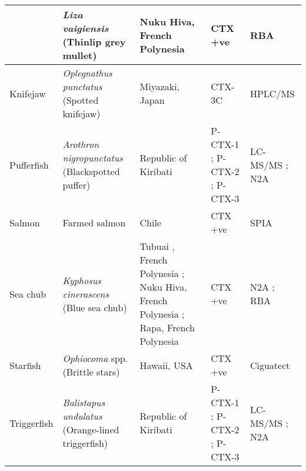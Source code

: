\documentclass[12pt]{article}
\begin{document}
\begin{longtable}[l]{ | p{2cm} | p{3cm} | p{4.5cm} | p{2cm} | p{3cm} | }
	& \emph{Liza vaigiensis} (Thinlip grey mullet) & Nuku Hiva, French Polynesia \cite{darius2007ciguatera} & CTX +ve \cite{darius2007ciguatera} & RBA \cite{darius2007ciguatera} \\
	\hline
	Knifejaw & \emph{Oplegnathus punctatus} (Spotted knifejaw) & Miyazaki, Japan \cite{yogi2011detailed} & CTX-3C \cite{yogi2011detailed} & HPLC/MS \cite{yogi2011detailed}\\
	\hline
Pufferfish & \emph{Arothron nigropunctatus} (Blackspotted puffer) & Republic of Kiribati \cite{mak2013pacific} & P-CTX-1 \cite{mak2013pacific}; P-CTX-2 \cite{mak2013pacific}; P-CTX-3 \cite{mak2013pacific} & LC-MS/MS \cite{mak2013pacific}; N2A \cite{mak2013pacific} \\
\hline
	Salmon & Farmed salmon & Chile \cite{ebesu1994first} & CTX +ve \cite{ebesu1994first} & SPIA \cite{ebesu1994first}\\
	\hline
	Sea chub & \emph{Kyphosus cinerascens} (Blue sea chub) & Tubuai , French Polynesia \cite{darius2007ciguatera}; Nuku Hiva, French Polynesia \cite{darius2007ciguatera}; Rapa, French Polynesia \cite{pawlowiez2013evaluation} & CTX +ve \cite{pawlowiez2013evaluation,darius2007ciguatera} & N2A \cite{pawlowiez2013evaluation}; RBA \cite{darius2007ciguatera} \\
	\hline
	Starfish & \emph{Ophiocoma} spp. (Brittle stars) & Hawaii, USA \cite{park2000microbial} & CTX +ve \cite{park2000microbial} & Ciguatect \textregistered \cite{park2000microbial} \\
	\hline
Triggerfish	& \emph{Balistapus undulatus} (Orange-lined triggerfish) & Republic of Kiribati \cite{mak2013pacific} & P-CTX-1 \cite{mak2013pacific}; P-CTX-2 \cite{mak2013pacific}; P-CTX-3 \cite{mak2013pacific} & LC-MS/MS \cite{mak2013pacific}; N2A \cite{mak2013pacific} \\
\hline
	\end{longtable}
		\FloatBarrier
\end{document}
